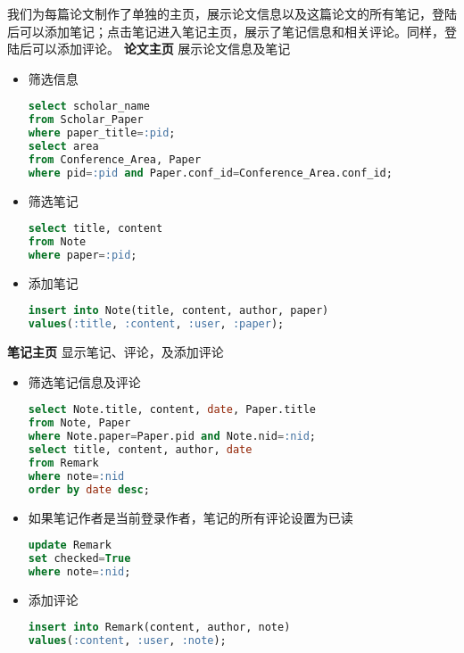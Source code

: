 我们为每篇论文制作了单独的主页，展示论文信息以及这篇论文的所有笔记，登陆后可以添加笔记；点击笔记进入笔记主页，展示了笔记信息和相关评论。同样，登陆后可以添加评论。
\noindent
{\bf 论文主页} 展示论文信息及笔记
\begin{itemize}
\item 筛选信息
\begin{lstlisting}[language=SQL]
select scholar_name
from Scholar_Paper
where paper_title=:pid;
select area
from Conference_Area, Paper
where pid=:pid and Paper.conf_id=Conference_Area.conf_id;
\end{lstlisting}
\item 筛选笔记
\begin{lstlisting}[language=SQL]
select title, content
from Note
where paper=:pid;
\end{lstlisting}
\item 添加笔记
\begin{lstlisting}[language=SQL]
insert into Note(title, content, author, paper)
values(:title, :content, :user, :paper);
\end{lstlisting}
\end{itemize}
{\bf 笔记主页} 显示笔记、评论，及添加评论
\begin{itemize}
\item 筛选笔记信息及评论
\begin{lstlisting}[language=SQL]
select Note.title, content, date, Paper.title
from Note, Paper
where Note.paper=Paper.pid and Note.nid=:nid;
select title, content, author, date
from Remark
where note=:nid
order by date desc;
\end{lstlisting}
\item 如果笔记作者是当前登录作者，笔记的所有评论设置为已读
\begin{lstlisting}[language=SQL]
update Remark
set checked=True
where note=:nid;
\end{lstlisting}
\item 添加评论
\begin{lstlisting}[language=SQL]
insert into Remark(content, author, note)
values(:content, :user, :note);
\end{lstlisting}
\end{itemize}